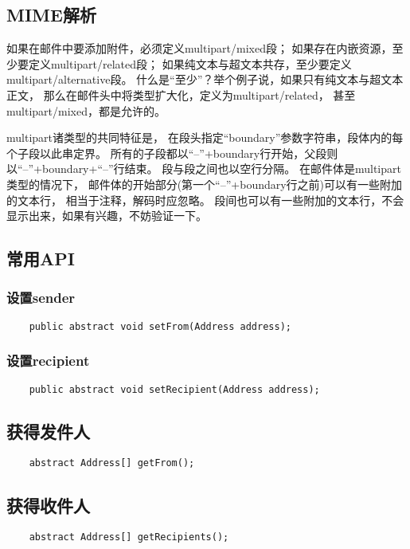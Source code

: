 \documentclass[a4paper,left=2.5cm,right=2.5cm,11pt]{article}
\begin{document}
\subsection{MIME解析}
	如果在邮件中要添加附件，必须定义multipart/mixed段；
	如果存在内嵌资源，至少要定义multipart/related段；
	如果纯文本与超文本共存，至少要定义multipart/alternative段。
	什么是“至少”？举个例子说，如果只有纯文本与超文本正文，
	那么在邮件头中将类型扩大化，定义为multipart/related，
	甚至multipart/mixed，都是允许的。\par

	multipart诸类型的共同特征是，
	在段头指定“boundary”参数字符串，段体内的每个子段以此串定界。
	所有的子段都以“--”+boundary行开始，父段则以“--”+boundary+“--”行结束。
	段与段之间也以空行分隔。
	在邮件体是multipart类型的情况下，
	邮件体的开始部分(第一个“--”+boundary行之前)可以有一些附加的文本行，
	相当于注释，解码时应忽略。
	段间也可以有一些附加的文本行，不会显示出来，如果有兴趣，不妨验证一下。

\subsection{常用API}
\subsubsection{设置sender}
	\begin{lstlisting}
	public abstract void setFrom(Address address);
	\end{lstlisting}

\subsubsection{设置recipient}
	\begin{lstlisting}
	public abstract void setRecipient(Address address);
	\end{lstlisting}

\subsection{获得发件人}
	\begin{lstlisting}
	abstract Address[] getFrom();
	\end{lstlisting}

\subsection{获得收件人}
	\begin{lstlisting}
	abstract Address[] getRecipients();
	\end{lstlisting}
\end{document}

